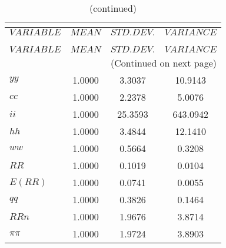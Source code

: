  
\begin{center}
\begin{longtable}{lccc} 
\caption{THEORETICAL MOMENTS}\\
 \label{Table:th_moments}\\
\toprule 
$VARIABLE  $	 & 	 $         MEAN$	 & 	 $    STD. DEV.$	 & 	 $     VARIANCE$\\
\midrule \endfirsthead 
\caption{(continued)}\\
 \toprule \\ 
$VARIABLE  $	 & 	 $         MEAN$	 & 	 $    STD. DEV.$	 & 	 $     VARIANCE$\\
\midrule \endhead 
\midrule \multicolumn{4}{r}{(Continued on next page)} \\ \bottomrule \endfoot 
\bottomrule \endlastfoot 
$yy        $	 & 	       1.0000	 & 	       3.3037	 & 	      10.9143 \\ 
$cc        $	 & 	       1.0000	 & 	       2.2378	 & 	       5.0076 \\ 
$ii        $	 & 	       1.0000	 & 	      25.3593	 & 	     643.0942 \\ 
$hh        $	 & 	       1.0000	 & 	       3.4844	 & 	      12.1410 \\ 
$ww        $	 & 	       1.0000	 & 	       0.5664	 & 	       0.3208 \\ 
$RR        $	 & 	       1.0000	 & 	       0.1019	 & 	       0.0104 \\ 
$E(RR)     $	 & 	       1.0000	 & 	       0.0741	 & 	       0.0055 \\ 
$qq        $	 & 	       1.0000	 & 	       0.3826	 & 	       0.1464 \\ 
$RRn       $	 & 	       1.0000	 & 	       1.9676	 & 	       3.8714 \\ 
$\pi\pi    $	 & 	       1.0000	 & 	       1.9724	 & 	       3.8903 \\ 
\end{longtable}
 \end{center}
